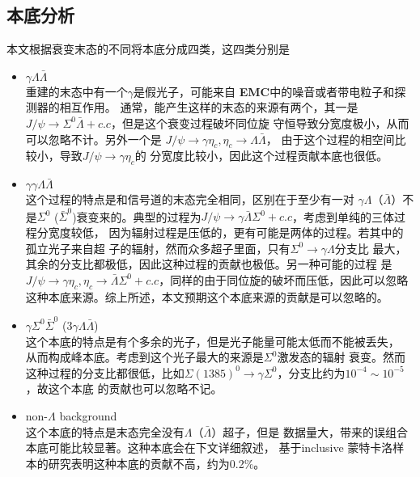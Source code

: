 \subsection{本底分析}%
\label{sec:sigma-signal-yield}
本文根据衰变末态的不同将本底分成四类，这四类分别是
\begin{itemize}
    \item $\gamma \Lambda \bar{\Lambda}$ \\
        重建的末态中有一个$\gamma$是假光子，可能来自
        \textbf{EMC}中的噪音或者带电粒子和探测器的相互作用。
        通常，能产生这样的末态的来源有两个，其一是$J/\psi \to
        \Sigma^{0} \bar{\Lambda} + c.c$，但是这个衰变过程破坏同位旋
        守恒导致分宽度极小，从而可以忽略不计。另外一个是
        $J/\psi \to \gamma \eta_{c}, \eta_{c} \to \Lambda \bar{\Lambda}$，
        由于这个过程的相空间比较小，导致$J/\psi \to \gamma \eta_{c}$的
        分宽度比较小，因此这个过程贡献本底也很低。
    \item $\gamma \gamma \Lambda \bar{\Lambda}$\\
        这个过程的特点是和信号道的末态完全相同，区别在于至少有一对
        $\gamma \Lambda$（$\bar{\Lambda}$）不是$\Sigma^{0}$
        ($\bar{\Sigma}^{0}$)衰变来的。典型的过程为$J/\psi \to \gamma
        \bar{\Lambda} \Sigma^{0} + c.c$，考虑到单纯的三体过程分宽度较低，
        因为辐射过程是压低的，更有可能是两体的过程。若其中的孤立光子来自超
        子的辐射，然而众多超子里面，只有$\Sigma^{0}\to \gamma \Lambda$分支比
        最大，其余的分支比都极低，因此这种过程的贡献也极低。另一种可能的过程
        是$J/\psi \to \gamma \eta_{c}, \eta_{c} \to \bar{\Lambda}
        \Sigma^{0} + c.c$，同样的由于同位旋的破坏而压低，因此可以忽略
        这种本底来源。综上所述，本文预期这个本底来源的贡献是可以忽略的。

    \item $\gamma \Sigma^{0} \bar{\Sigma}^{0}$ ($3\gamma \Lambda
        \bar{\Lambda}$)\\
        这个本底的特点是有个多余的光子，但是光子能量可能太低而不能被丢失，
        从而构成峰本底。考虑到这个光子最大的来源是$\Sigma^{0}$激发态的辐射
        衰变。然而这种过程的分支比都很低，比如${\Sigma(1385)}^{0} 
        \to \gamma \Sigma^{0}$，分支比约为$10^{-4} \sim 10^{-5}$，故这个本底
        的贡献也可以忽略不记。
    \item non-$\Lambda$ background \\
        这个本底的特点是末态完全没有$\Lambda$（$\bar{\Lambda}$）超子，但是
        数据量大，带来的误组合本底可能比较显著。这种本底会在下文详细叙述，
        基于inclusive 蒙特卡洛样本的研究表明这种本底的贡献不高，约为0.2\%。
\end{itemize}
